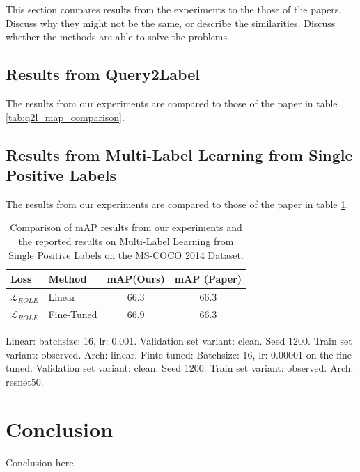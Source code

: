 \documentclass[lettersize,journal]{IEEEtran}
\begin{document}
This section compares results from the experiments to the those of the papers. Discuss why they might not be the same, or describe the similarities. Discuss whether the methods are able to solve the problems.


\subsection{Results from Query2Label}
The results from our experiments are compared to those of the paper in table \ref{tab:q2l_map_comparison}. 



\subsection{Results from Multi-Label Learning from Single Positive Labels}
The results from our experiments are compared to those of the paper in table \ref{tab:MLSPL_map_comparison}. 

\begin{table}[h]
    \small
    \caption{Comparison of mAP results from our experiments and the reported results on Multi-Label Learning from Single Positive Labels on the MS-COCO 2014 Dataset.}
    \label{tab:MLSPL_map_comparison}
    \centering
    \begin{tabular}{l l c c}
    \toprule
    \textbf{Loss} & \textbf{Method} & \textbf{mAP(Ours)} & \textbf{mAP (Paper)} \\
    \midrule
    $\mathcal{L}_{ROLE}$ & Linear & 66.3 & 66.3 \\
    $\mathcal{L}_{ROLE}$ & Fine-Tuned & 66.9 & 66.3 \\
    \bottomrule
    \end{tabular}
\end{table}

Linear: batchsize: 16, lr: 0.001. Validation set variant: clean. Seed 1200. Train set variant: observed. Arch: linear.
Finte-tuned: Batchsize: 16, lr: 0.00001 on the fine-tuned. Validation set variant: clean. Seed 1200. Train set variant: observed. Arch: resnet50.


\section{Conclusion}

Conclusion here.






\end{document}
